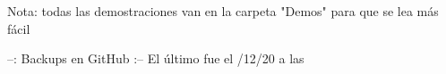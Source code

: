 Nota: todas las demostraciones van en la carpeta "Demos" para que se lea más fácil



--: Backups en GitHub :--
El último fue el /12/20 a las 